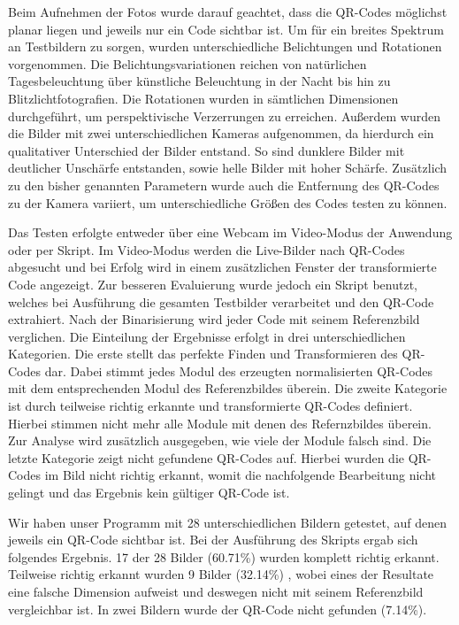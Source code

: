 \documentclass[a4paper, oneside, 12pt]{article}
\begin{document}
Beim Aufnehmen der Fotos wurde darauf geachtet, dass die QR-Codes möglichst planar liegen und jeweils nur ein Code sichtbar ist. Um für ein breites Spektrum an Testbildern zu sorgen, wurden unterschiedliche Belichtungen und Rotationen vorgenommen. Die Belichtungsvariationen reichen von natürlichen Tagesbeleuchtung über künstliche Beleuchtung in der Nacht bis hin zu Blitzlichtfotografien. Die Rotationen wurden in sämtlichen Dimensionen durchgeführt, um perspektivische Verzerrungen zu erreichen. Außerdem wurden die Bilder mit zwei unterschiedlichen Kameras aufgenommen, da hierdurch ein qualitativer Unterschied der Bilder entstand. So sind dunklere Bilder mit deutlicher Unschärfe entstanden, sowie helle Bilder mit hoher Schärfe. Zusätzlich zu den bisher genannten Parametern wurde auch die Entfernung des QR-Codes zu der Kamera variiert, um unterschiedliche Größen des Codes testen zu können.

Das Testen erfolgte entweder über eine Webcam im Video-Modus der Anwendung oder per Skript. Im Video-Modus werden die Live-Bilder nach QR-Codes abgesucht und bei Erfolg wird in einem zusätzlichen Fenster der transformierte Code angezeigt. Zur besseren Evaluierung wurde jedoch ein Skript benutzt, welches bei Ausführung die gesamten Testbilder verarbeitet und den QR-Code extrahiert. Nach der Binarisierung wird jeder Code mit seinem Referenzbild verglichen. Die Einteilung der Ergebnisse erfolgt in drei unterschiedlichen Kategorien. Die erste stellt das perfekte Finden und Transformieren des QR-Codes dar. Dabei stimmt jedes Modul des erzeugten normalisierten QR-Codes mit dem entsprechenden Modul des Referenzbildes überein. Die zweite Kategorie ist durch teilweise richtig erkannte und transformierte QR-Codes definiert. Hierbei stimmen nicht mehr alle Module mit denen des Refernzbildes überein. Zur Analyse wird zusätzlich ausgegeben, wie viele der Module falsch sind. Die letzte Kategorie zeigt nicht gefundene QR-Codes auf. Hierbei wurden die QR-Codes im Bild nicht richtig erkannt, womit die nachfolgende Bearbeitung nicht gelingt und das Ergebnis kein gültiger QR-Code ist. 

Wir haben unser Programm mit 28 unterschiedlichen Bildern getestet, auf denen jeweils ein QR-Code sichtbar ist. Bei der Ausführung des Skripts ergab sich folgendes Ergebnis. 17 der 28 Bilder (60.71\%) wurden komplett richtig erkannt. Teilweise richtig erkannt wurden 9 Bilder (32.14\%) , wobei eines der Resultate eine falsche Dimension aufweist und deswegen nicht mit seinem Referenzbild vergleichbar ist. In zwei Bildern wurde der QR-Code nicht gefunden (7.14\%).
\end{document}
